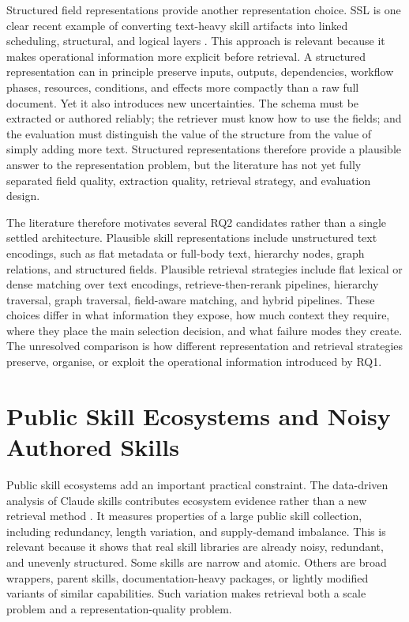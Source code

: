 Structured field representations provide another representation choice. SSL is one clear recent example of converting text-heavy skill artifacts into linked scheduling, structural, and logical layers \cite{liang2026ssl}. This approach is relevant because it makes operational information more explicit before retrieval. A structured representation can in principle preserve inputs, outputs, dependencies, workflow phases, resources, conditions, and effects more compactly than a raw full document. Yet it also introduces new uncertainties. The schema must be extracted or authored reliably; the retriever must know how to use the fields; and the evaluation must distinguish the value of the structure from the value of simply adding more text. Structured representations therefore provide a plausible answer to the representation problem, but the literature has not yet fully separated field quality, extraction quality, retrieval strategy, and evaluation design.

The literature therefore motivates several RQ2 candidates rather than a single settled architecture. Plausible skill representations include unstructured text encodings, such as flat metadata or full-body text, hierarchy nodes, graph relations, and structured fields. Plausible retrieval strategies include flat lexical or dense matching over text encodings, retrieve-then-rerank pipelines, hierarchy traversal, graph traversal, field-aware matching, and hybrid pipelines. These choices differ in what information they expose, how much context they require, where they place the main selection decision, and what failure modes they create. The unresolved comparison is how different representation and retrieval strategies preserve, organise, or exploit the operational information introduced by RQ1.

\section{Public Skill Ecosystems and Noisy Authored Skills}

Public skill ecosystems add an important practical constraint. The data-driven analysis of Claude skills contributes ecosystem evidence rather than a new retrieval method \cite{ling2026claudeskills}. It measures properties of a large public skill collection, including redundancy, length variation, and supply-demand imbalance. This is relevant because it shows that real skill libraries are already noisy, redundant, and unevenly structured. Some skills are narrow and atomic. Others are broad wrappers, parent skills, documentation-heavy packages, or lightly modified variants of similar capabilities. Such variation makes retrieval both a scale problem and a representation-quality problem.

